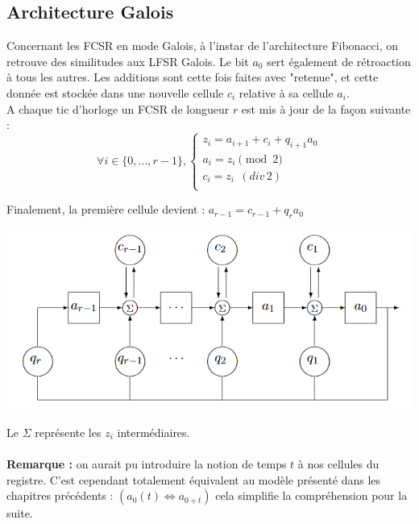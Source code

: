 \documentclass[11pt]{report}
\begin{document}
\subsection{Architecture Galois}
	
	Concernant les FCSR en mode Galois, à l'instar de l'architecture Fibonacci, on retrouve des similitudes aux LFSR Galois. Le bit $a_0$ sert également de rétroaction à tous les autres. Les additions sont cette fois faites avec "retenue", et cette donnée est stockée dans une nouvelle cellule $c_i$ relative à sa cellule $a_i$.
	\\
	A chaque tic d'horloge un FCSR de longueur $r$ est mis à jour de la façon suivante : 
	$$	
	\forall i \in \{0,...,r-1\},
	 \left\{
	 \begin{array}{cc}
	 z_i = a_{i+1} + c_i + q_{i+1}a_0\\
	 a_i = z_i\pmod 2\\
	 c_i = z_i \;\,( div \, 2)\\
	 \end{array} 
	\right. 
	$$
	
	Finalement, la première cellule devient : $a_{r-1}=c_{r-1}+q_ra_0$
	
	\begin{center}
	
	\includegraphics[scale=0.7]{GaloisFCSR.png}
	\label{FCSRGalois}
	\end{center}
	
	Le $\Sigma$ représente les $z_i$ intermédiaires.
	\\\\
\textbf{Remarque :} on aurait pu introduire la notion de temps $t$ à nos cellules du registre. C'est cependant totalement équivalent au modèle présenté dans les chapitres précédents : $(a_0(t) \Leftrightarrow a_{0+t})$ cela simplifie la compréhension pour la suite. \\\\
\end{document}
